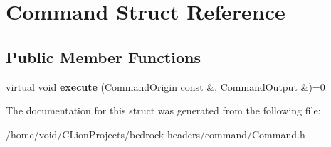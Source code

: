 \hypertarget{struct_command}{}\section{Command Struct Reference}
\label{struct_command}
\subsection*{Public Member Functions}
\begin{DoxyCompactItemize}
\item 
\mbox{\label{struct_command_ab1c5713d308e5757900f60ab26882c0b}} 
virtual void {\bfseries execute} (Command\+Origin const \&, \mbox{\hyperlink{struct_command_output}{Command\+Output}} \&)=0
\end{DoxyCompactItemize}


The documentation for this struct was generated from the following file\+:\begin{DoxyCompactItemize}
\item 
/home/void/\+C\+Lion\+Projects/bedrock-\/headers/command/Command.\+h\end{DoxyCompactItemize}
